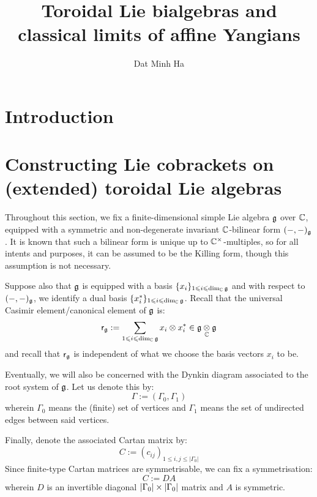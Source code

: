 

\setcounter{section}{-1}





    \title{Toroidal Lie bialgebras and classical limits of affine Yangians}
    
    \author{Dat Minh Ha}
    \maketitle
    
    \begin{abstract}
        
    \end{abstract}
    
    {
    \hypersetup{} 
    \tableofcontents %
    \listoftodos
    }

    \section{Introduction}

    \section{Constructing Lie cobrackets on (extended) toroidal Lie algebras}
        \begin{convention} \label{conv: a_fixed_finite_dimensional_simple_lie_algebra}
            Throughout this section, we fix a finite-dimensional simple Lie algebra $\mathfrak{g}$ over $\mathbb{C}$, equipped with a symmetric and non-degenerate invariant $\mathbb{C}$-bilinear form $(-, -)_{\mathfrak{g}}$. It is known that such a bilinear form is unique up to $\bbC^{\x}$-multiples, so for all intents and purposes, it can be assumed to be the Killing form, though this assumption is not necessary. 

            Suppose also that $\mathfrak{g}$ is equipped with a basis $\{x_i\}_{1 \leqslant i \leqslant \dim_{\mathbb{C}} \mathfrak{g}}$ and with respect to $(-, -)_{\mathfrak{g}}$, we identify a dual basis $\{x_i^*\}_{1 \leqslant i \leqslant \dim_{\mathbb{C}} \mathfrak{g}}$. Recall that the universal Casimir element/canonical element of $\mathfrak{g}$ is:
                $$\sfr_{\g} := \sum_{1 \leq i \leq \dim_{\bbC} \g} x_i \tensor x_i^* \in \g \tensor_{\bbC} \g$$
            and recall that $\mathsf{r}_{\mathfrak{g}}$ is independent of what we choose the basis vectors $x_i$ to be.

            Eventually, we will also be concerned with the Dynkin diagram associated to the root system of $\mathfrak{g}$. Let us denote this by:
                $$\Gamma := (\Gamma_0, \Gamma_1)$$
            wherein $\Gamma_0$ means the (finite) set of vertices and $\Gamma_1$ means the set of undirected edges between said vertices. 

            Finally, denote the associated Cartan matrix by:
                $$C := (c_{ij})_{1 \leq i, j \leq |\Gamma_0|}$$
            Since finite-type Cartan matrices are symmetrisable, we can fix a symmetrisation:
                $$C := D A$$
            wherein $D$ is an invertible diagonal $|\Gamma_0| \x |\Gamma_0|$ matrix and $A$ is symmetric. 
        \end{convention}

